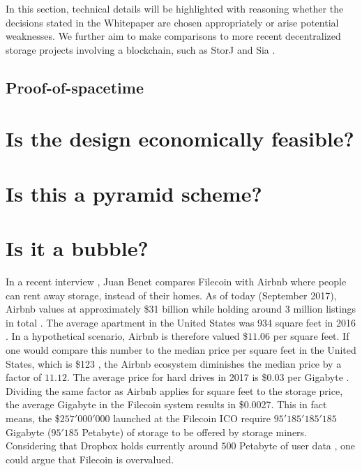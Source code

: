 \documentclass[journal]{IEEEtran}
\begin{document}
In this section, technical details will be highlighted with reasoning whether the decisions stated in the Whitepaper\cite{filecoin} are chosen appropriately or arise potential weaknesses.
We further aim to make comparisons to more recent decentralized storage projects involving a blockchain, such as StorJ \cite{storj} and Sia \cite{Sia}.

\subsection{Proof-of-spacetime}


\section{Is the design economically feasible?}

\section{Is this a pyramid scheme?}

\section{Is it a bubble?}

In a recent interview \cite{podcast}, Juan Benet compares Filecoin with Airbnb \cite{airbnb} where people can rent away storage, instead of their homes.
As of today (September 2017), Airbnb values at approximately \$31 billion while holding around 3 million listings in total \cite{airbnb-valuation}.
The average apartment in the United States was 934 square feet in 2016 \cite{housing-cnbc}.
In a hypothetical scenario, Airbnb is therefore valued \$$11.06$ per square feet. 
If one would compare this number to the median price per square feet in the United States, which is \$123 \cite{home-prices}, the Airbnb ecosystem diminishes the median price by a factor of $11.12$.
The average price for hard drives in 2017 is \$0.03 per Gigabyte \cite{hard-drive}.
Dividing the same factor as Airbnb applies for square feet to the storage price, the average Gigabyte in the Filecoin system results in \$0.0027.
This in fact means, the \$$257'000'000$ launched at the Filecoin ICO require $95'185'185'185$ Gigabyte ($95'185$ Petabyte) of storage to be offered by storage miners.
Considering that Dropbox \cite{dropbox} holds currently around $500$ Petabyte of user data \cite{dropbox-userdata}, one could argue that Filecoin is overvalued.
\end{document}
